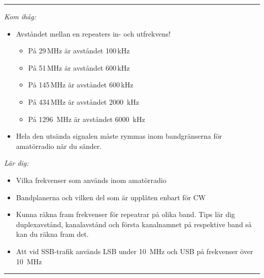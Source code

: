 
\vspace{1em} \hrule \vspace{1em}

\emph{Kom ihåg:}

\begin{itemize}
	\item Avståndet mellan en repeaters in- och utfrekvens!
	\begin{itemize}
		\item På 29\,MHz är avståndet 100\,kHz
		\item På 51\,MHz är avståndet 600\,kHz
		\item På 145\,MHz är avståndet 600\,kHz
		\item På 434\,MHz är avståndet \SI{2000}{kHz}
		\item På \SI{1296}{MHz} är avståndet \SI{6000}{kHz}
	\end{itemize}
	\item Hela den utsända signalen måste rymmas inom bandgränserna för amatörradio när du sänder.
\end{itemize}

\emph{Lär dig:}

\begin{itemize}
	\item Vilka frekvenser som används inom amatörradio
	\item Bandplanerna och vilken del som är upplåten enbart för CW
	\item Kunna räkna fram frekvenser för repeatrar på olika band. Tips lär dig duplexavstånd, kanalavstånd och första kanalnamnet på respektive band så kan du räkna fram det.
	\item Att vid SSB-trafik används LSB under \SI{10}{MHz} och USB på frekvenser över \SI{10}{MHz}
\end{itemize}

\vspace{1em} \hrule \vspace{1em}



